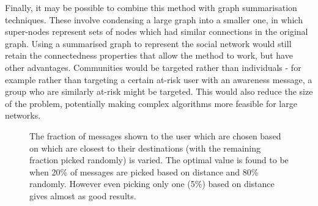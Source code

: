 \documentclass[bsc,frontabs,twoside,singlespacing,parskip,deptreport]{infthesis}     %
\begin{document}
Finally, it may be possible to combine this method with graph summarisation techniques\cite{GraphSummary}. These involve condensing a large graph into a smaller one, in which super-nodes represent sets of nodes which had similar connections in the original graph. Using a summarised graph to represent the social network would still retain the connectedness properties that allow the method to work, but have other advantages. Communities would be targeted rather than individuals - for example rather than targeting a certain at-risk user with an awareness message, a group who are similarly at-risk might be targeted. This would also reduce the size of the problem, potentially making complex algorithms more feasible for large networks.

\begin{figure}
\centering
{}
\caption{The fraction of messages shown to the user which are chosen based on which are closest to their destinations (with the remaining fraction picked randomly) is varied. The optimal value is found to be when 20\% of messages are picked based on distance and 80\% randomly. However even picking only one (5\%) based on distance gives almost as good results.}
\label{fig:distance_priority_fraction_intro}
\end{figure}
\end{document}
